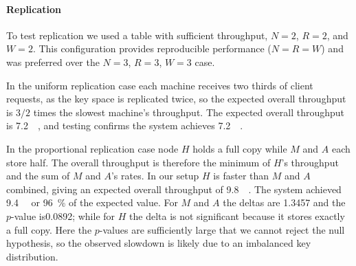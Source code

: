 \paragraph{Replication}
To test replication we used a table with sufficient throughput, $N=2$, $R=2$, and $W=2$.
This configuration provides reproducible performance ($N=R=W$) and was preferred over the $N=3$, $R=3$, $W=3$ case.

In the uniform replication case each machine receives two thirds of client requests, as the key space is replicated twice,
so the expected overall throughput is $3/2$ times the slowest machine's throughput.
The expected overall throughput is \qty{7.2}{\kilo\rps}, and testing confirms the system achieves \qty{7.2}{\kilo\rps}.


In the proportional replication case node $H$ holds a full copy while $M$ and $A$ each store half.
The overall throughput is therefore the minimum of $H$'s throughput and the sum of $M$ and $A$'s rates.
In our setup $H$ is faster than $M$ and $A$ combined, giving an expected overall throughput of \qty{9.8}{\kilo\rps}.
The system achieved \qty{9.4}{\kilo\rps} or \qty{96}{\percent} of the expected value.
For $M$ and $A$ the deltas are \num{1.3457} and the $p$-value is\num{0.0892};
while for $H$ the delta is not significant because it stores exactly a full copy.
Here the $p$-values are sufficiently large that we cannot reject the null hypothesis,
so the observed slowdown is likely due to an imbalanced key distribution.



